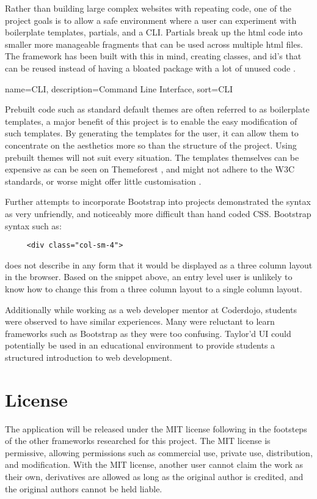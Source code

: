 Rather than building large complex websites with repeating code, one of the project goals is to allow a safe environment where a user can experiment with boilerplate templates, partials, and a \gls{CLI}. Partials break up the html code into smaller more manageable fragments that can be used across multiple html files. The framework has been built with this in mind, creating classes, and id's that can be reused instead of having a bloated package with a lot of unused code \citep{KAR15}.

{
  name={CLI},
  description={Command Line Interface},
  sort=CLI
}

Prebuilt code such as standard default themes are often referred to as boilerplate templates, a major benefit of this project is to enable the easy modification of such templates. By generating the templates for the user, it can allow them to concentrate on the aesthetics more so than the structure of the project. Using prebuilt themes will not suit every situation. The templates themselves can be expensive as can be seen on Themeforest \citep{THEME17}, and might not adhere to the W3C standards, or worse might offer little customisation \citep{NATH16}. 

Further attempts to incorporate Bootstrap into projects demonstrated the syntax as very unfriendly, and noticeably more difficult than hand coded \gls{CSS}. Bootstrap syntax such as: \begin{lstlisting}
	 <div class="col-sm-4">\end{lstlisting} 
	 does not describe in any form that it would be displayed as a three column layout in the browser. Based on the snippet above, an entry level user is unlikely to know how to change this from a three column layout to a single column layout. 
	 
Additionally while working as a web developer mentor at Coderdojo, students were observed to have similar experiences. Many were reluctant to learn frameworks such as Bootstrap as they were too confusing. Taylor'd UI could potentially be used in an educational environment to provide students a structured introduction to web development.
%
\section*{License}
The application will be released under the MIT license following in the footsteps of the other frameworks researched for this project. The MIT license is permissive, allowing permissions such as commercial use, private use, distribution, and modification. With the MIT license, another user cannot claim the work as their own, derivatives are allowed as long as the original author is credited, and the original authors cannot be held liable.

